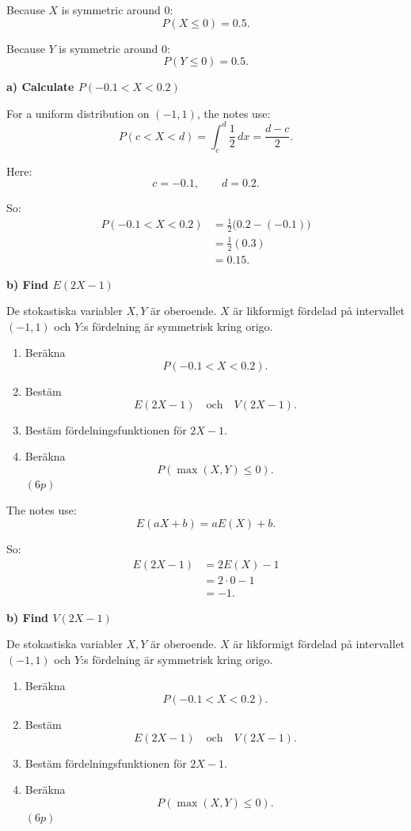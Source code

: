 \documentclass[10pt]{article}
\begin{document}
Because \(X\) is symmetric around \(0\):
\[
P(X\le 0)=0.5.
\]

Because \(Y\) is symmetric around \(0\):
\[
P(Y\le 0)=0.5.
\]

\textbf{a) Calculate \(P(-0.1<X<0.2)\)}

For a uniform distribution on \((-1,1)\), the notes
use:
\[
P(c<X<d)
=
\int_c^d \frac12\,dx
=
\frac{d-c}{2}.
\]

Here:
\[
c=-0.1,
\qquad
d=0.2.
\]

So:
\begin{align*}
P(-0.1<X<0.2)
&=
\frac12
\bigl(0.2-(-0.1)\bigr)
\\[2mm]
&=
\frac12(0.3)
\\[2mm]
&=
0.15.
\end{align*}

\textbf{b) Find \(E(2X-1)\)}

De stokastiska variabler \(X,Y\) är oberoende.
\(X\) är likformigt fördelad på intervallet
\((-1,1)\) och \(Y\):s fördelning är symmetrisk
kring origo.

\begin{enumerate}[label=\alph*)]
\item Beräkna
\[
P(-0.1<X<0.2).
\]

\item Bestäm
\[
E(2X-1)
\quad\text{och}\quad
V(2X-1).
\]

\item Bestäm fördelningsfunktionen för \(2X-1\).

\item Beräkna
\[
P(\max(X,Y)\le 0).
\]
\((6p)\)
\end{enumerate}

The notes use:
\[
E(aX+b)=aE(X)+b.
\]

So:
\begin{align*}
E(2X-1)
&=
2E(X)-1
\\[2mm]
&=
2\cdot 0-1
\\[2mm]
&=
-1.
\end{align*}

\textbf{b) Find \(V(2X-1)\)}

De stokastiska variabler \(X,Y\) är oberoende.
\(X\) är likformigt fördelad på intervallet
\((-1,1)\) och \(Y\):s fördelning är symmetrisk
kring origo.

\begin{enumerate}[label=\alph*)]
\item Beräkna
\[
P(-0.1<X<0.2).
\]

\item Bestäm
\[
E(2X-1)
\quad\text{och}\quad
V(2X-1).
\]

\item Bestäm fördelningsfunktionen för \(2X-1\).

\item Beräkna
\[
P(\max(X,Y)\le 0).
\]
\((6p)\)
\end{enumerate}
\end{document}
